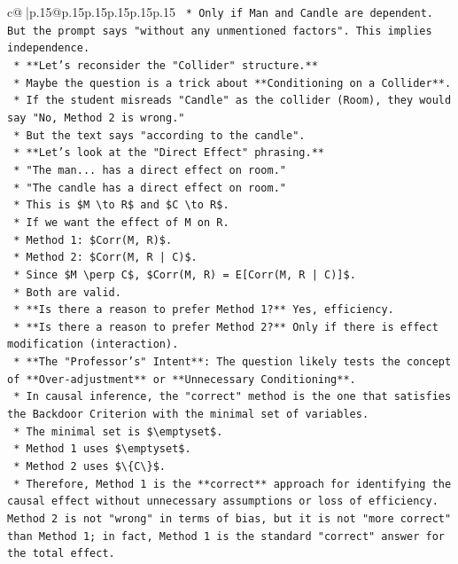 \documentclass{article}
\begin{document}
{\begin{supertabular}{c@{$\;$}|p{.15\linewidth}@{}p{.15\linewidth}p{.15\linewidth}p{.15\linewidth}p{.15\linewidth}p{.15\linewidth}}
{{{\texttt{    *   Only if Man and Candle are dependent. But the prompt says "without any unmentioned factors". This implies independence.} \\
\texttt{    *   **Let's reconsider the "Collider" structure.**} \\
\texttt{    *   Maybe the question is a trick about **Conditioning on a Collider**.} \\
\texttt{    *   If the student misreads "Candle" as the collider (Room), they would say "No, Method 2 is wrong."} \\
\texttt{    *   But the text says "according to the candle".} \\
\texttt{    *   **Let's look at the "Direct Effect" phrasing.**} \\
\texttt{    *   "The man... has a direct effect on room."} \\
\texttt{    *   "The candle has a direct effect on room."} \\
\texttt{    *   This is \$M \textbackslash{}to R\$ and \$C \textbackslash{}to R\$.} \\
\texttt{    *   If we want the effect of M on R.} \\
\texttt{    *   Method 1: \$Corr(M, R)\$.} \\
\texttt{    *   Method 2: \$Corr(M, R | C)\$.} \\
\texttt{    *   Since \$M \textbackslash{}perp C\$, \$Corr(M, R) = E{[}Corr(M, R | C){]}\$.} \\
\texttt{    *   Both are valid.} \\
\texttt{    *   **Is there a reason to prefer Method 1?** Yes, efficiency.} \\
\texttt{    *   **Is there a reason to prefer Method 2?** Only if there is effect modification (interaction).} \\
\texttt{    *   **The "Professor's" Intent**: The question likely tests the concept of **Over{-}adjustment** or **Unnecessary Conditioning**.} \\
\texttt{    *   In causal inference, the "correct" method is the one that satisfies the Backdoor Criterion with the minimal set of variables.} \\
\texttt{    *   The minimal set is \$\textbackslash{}emptyset\$.} \\
\texttt{    *   Method 1 uses \$\textbackslash{}emptyset\$.} \\
\texttt{    *   Method 2 uses \$\textbackslash{}\{C\textbackslash{}\}\$.} \\
\texttt{    *   Therefore, Method 1 is the **correct** approach for identifying the causal effect without unnecessary assumptions or loss of efficiency. Method 2 is not "wrong" in terms of bias, but it is not "more correct" than Method 1; in fact, Method 1 is the standard "correct" answer for the total effect.} \\
}}}
\end{supertabular}}
\end{document}
